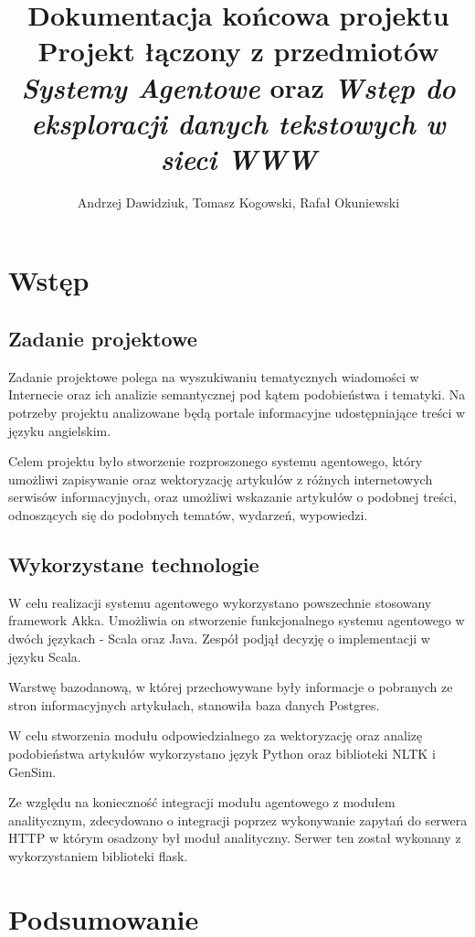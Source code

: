 \documentclass[a4paper]{article}
\title{\Large{Dokumentacja końcowa projektu} \\
Projekt łączony z przedmiotów \textit{Systemy Agentowe} oraz \textit{Wstęp do eksploracji danych tekstowych w sieci WWW}}
\author{Andrzej Dawidziuk, Tomasz Kogowski, Rafał Okuniewski}
\begin{document}
\maketitle

\section{Wstęp}

\subsection{Zadanie projektowe}
\par Zadanie projektowe polega na wyszukiwaniu tematycznych wiadomości w Internecie oraz ich analizie semantycznej pod kątem podobieństwa i tematyki. Na potrzeby projektu analizowane będą portale informacyjne udostępniające treści w języku angielskim.
\par Celem projektu było stworzenie rozproszonego systemu agentowego, który umożliwi zapisywanie oraz wektoryzację artykułów z różnych internetowych serwisów informacyjnych, oraz umożliwi wskazanie artykułów o podobnej treści, odnoszących się do podobnych tematów, wydarzeń, wypowiedzi.

\subsection{Wykorzystane technologie}

\par W celu realizacji systemu agentowego wykorzystano powszechnie stosowany framework Akka\cite{Akka}. Umożliwia on stworzenie funkcjonalnego systemu agentowego w dwóch językach - Scala oraz Java. Zespół podjął decyzję o implementacji w języku Scala.
\par Warstwę bazodanową, w której przechowywane były informacje o pobranych ze stron informacyjnych artykułach, stanowiła baza danych Postgres.
\par W celu stworzenia modułu odpowiedzialnego za wektoryzację oraz analizę podobieństwa artykułów wykorzystano język Python oraz biblioteki NLTK\cite{nltk} i GenSim\cite{gensim}.
\par Ze względu na konieczność integracji modułu agentowego z modułem analitycznym, zdecydowano o integracji poprzez wykonywanie zapytań do serwera HTTP w którym osadzony był moduł analityczny. Serwer ten został wykonany z wykorzystaniem biblioteki flask\cite{flask}.







\section{Podsumowanie}



\end{document}
